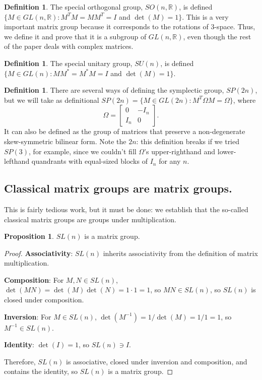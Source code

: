 \documentclass[12pt]{article}
\newcommand{\R}{\mathbb{R}}
\newcommand{\sun}{SU (n)}
\newcommand{\son}{SO (n, \R)}
\theoremstyle{definition}
\newtheorem{prop}[them]{Proposition}
\theoremstyle{definition}
\theoremstyle{definition}
\theoremstyle{definition}
\theoremstyle{definition}
\newtheorem{defn}[them]{Definition}
\theoremstyle{definition}
\theoremstyle{definition}
\theoremstyle{definition}
\begin{document}
\begin{defn}
The special orthogonal group, $\son$, is
defined $\{M \in GL(n, \R): M^T M = M M^T = I$ and
$\det(M) = 1\}$. This is a very important matrix
group because it corresponds to the rotations of
$3$-space. Thus, we define it and prove that it is
a subgroup of $GL(n, \R)$, even though the rest of
the paper deals with complex matrices.
\end{defn}

\begin{defn} 
The special unitary group, $\sun$, is defined $\{M
\in GL(n) : MM^* = M^*M = I$ and $\det(M) = 1\}$.
\end{defn}

\begin{defn}
There are several ways of defining the symplectic
group, $SP(2n)$, but we will take as definitional
$SP(2n) = \{M \in GL(2n): M^T\Omega M = \Omega\}$,
where 
\[
\Omega = 
\begin{bmatrix} 
    0 & -I_n \\
    I_n & 0 
\end{bmatrix}.
\]
It can also be defined as
the group of matrices that preserve a
non-degenerate skew-symmetric bilinear form. Note
the $2n$: this definition breaks if we tried
$SP(3)$, for example, since we couldn't fill
$\Omega$’s upper-righthand and lower-lefthand
quandrants with equal-sized blocks of $I_n$ for
any $n$.
\end{defn}

\subsection{Classical matrix groups are matrix groups.}

\par{This is fairly tedious work, but it must be done: we establish that the so-called classical matrix groups are groups under multiplication.}

\begin{prop}
$SL(n)$ is a matrix group.
\end{prop}
\begin{proof}
\par{\textbf{Associativity}: $SL(n)$ inherits associativity from the definition of matrix multiplication.}

\par{\textbf{Composition}: For $M, N \in SL(n)$, $\det(MN) = \det(M) \det(N) = 1 \cdot 1 = 1$, so $MN \in SL(n)$, so $SL(n)$ is closed under composition.}

\par{\textbf{Inversion}: For $M \in SL(n)$, $\det(M^{-1}) = 1 /
\det(M) = 1 / 1 = 1$, so $M^{-1} \in SL(n)$.}

\par{\textbf{Identity}: $\det(I) = 1$, so $SL(n) \ni I$.}

\par{Therefore, $SL(n)$ is associative, closed under inversion and composition, and contains the identity, so $SL(n)$ is a matrix group.}
\end{proof}
    
\end{document}
